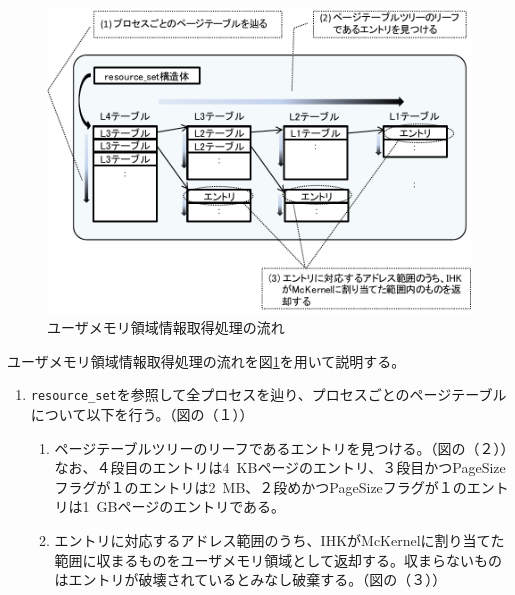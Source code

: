 \documentclass[twoside,11pt,fleqn]{book}
\begin{document}
\subsection{}
\begin{figure}[!ht]
  \includegraphics[width=0.9\linewidth]{figs/chap01_fig009.pdf}
  \caption{ユーザメモリ領域情報取得処理の流れ}
  \label{figure:chap01_fig009}
\end{figure}
\FloatBarrier
%
ユーザメモリ領域情報取得処理の流れを図\ref{figure:chap01_fig009}を用いて説明する。
\begin{enumerate}
\item \texttt{resource\_set}を参照して全プロセスを辿り、プロセスごとのページテーブルについて以下を行う。（図の（１））
\begin{enumerate}
\item ページテーブルツリーのリーフであるエントリを見つける。（図の（２））なお、４段目のエントリは4~KBページのエントリ、３段目かつPageSizeフラグが１のエントリは2~MB、２段めかつPageSizeフラグが１のエントリは1~GBページのエントリである。
\item エントリに対応するアドレス範囲のうち、IHKがMcKernelに割り当てた範囲に収まるものをユーザメモリ領域として返却する。収まらないものはエントリが破壊されているとみなし破棄する。（図の（３））
\end{enumerate}
\end{enumerate}
\end{document}
